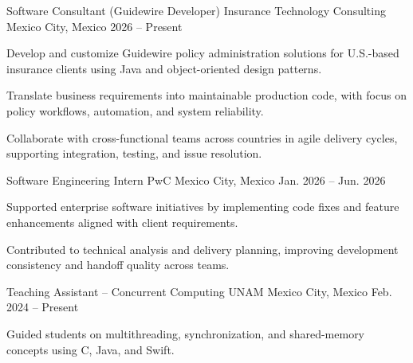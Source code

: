 \begin{cventries}

  \cventry
    {Software Consultant (Guidewire Developer)}
    {Insurance Technology Consulting}
    {Mexico City, Mexico}
    {2026 -- Present}
    {
      \begin{cvitems}
        \item {Develop and customize Guidewire policy administration solutions for U.S.-based insurance clients using Java and object-oriented design patterns.}
        \item {Translate business requirements into maintainable production code, with focus on policy workflows, automation, and system reliability.}
        \item {Collaborate with cross-functional teams across countries in agile delivery cycles, supporting integration, testing, and issue resolution.}
      \end{cvitems}
    }

  \cventry
    {Software Engineering Intern}
    {PwC}
    {Mexico City, Mexico}
    {Jan. 2026 -- Jun. 2026}
    {
      \begin{cvitems}
        \item {Supported enterprise software initiatives by implementing code fixes and feature enhancements aligned with client requirements.}
        \item {Contributed to technical analysis and delivery planning, improving development consistency and handoff quality across teams.}
      \end{cvitems}
    }

  \cventry
    {Teaching Assistant -- Concurrent Computing}
    {UNAM}
    {Mexico City, Mexico}
    {Feb. 2024 -- Present}
    {
      \begin{cvitems}
        \item {Guided students on multithreading, synchronization, and shared-memory concepts using C, Java, and Swift.}
      \end{cvitems}
    }

\end{cventries}

